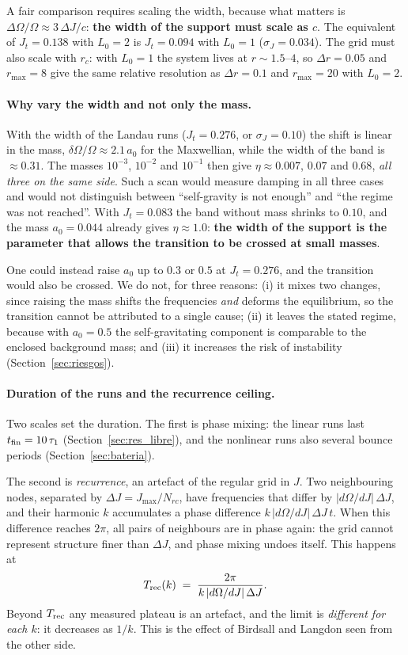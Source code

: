 \documentclass[11pt,a4paper]{article}
\begin{document}
A fair comparison requires scaling the width, because what matters is
$\Delta\Omega/\Omega\approx 3\,\Delta J/c$: \textbf{the width of the support must scale as $c$}. The
equivalent of $J_t=0.138$ with $L_0=2$ is $J_t=0.094$ with $L_0=1$ ($\sigma_J=0.034$). The grid must
also scale with $r_c$: with $L_0=1$ the system lives at $r\sim1.5$--$4$, so $\Delta r=0.05$ and
$r_{\max}=8$ give the same relative resolution as $\Delta r=0.1$ and $r_{\max}=20$ with $L_0=2$.

\paragraph{Why vary the width and not only the mass.}
\label{sec:ancho}
With the width of the Landau runs ($J_t=0.276$, or $\sigma_J=0.10$) the shift is linear in the
mass, $\delta\Omega/\Omega\approx 2.1\,a_0$ for the Maxwellian, while the width of the band is $\approx 0.31$.
The masses $10^{-3}$, $10^{-2}$ and $10^{-1}$ then give $\eta\approx0.007$, $0.07$ and $0.68$, \emph{all
three on the same side}. Such a scan would measure damping in all three cases and would
not distinguish between ``self-gravity is not enough'' and ``the regime was not
reached''. With $J_t=0.083$ the band without mass shrinks to $0.10$, and the mass $a_0=0.044$
already gives $\eta\approx 1.0$: \textbf{the width of the support is the parameter that allows
the transition to be crossed at small masses}.

One could instead raise $a_0$ up to $0.3$ or $0.5$ at $J_t=0.276$, and the transition would also
be crossed. We do not, for three reasons: (i) it mixes two changes, since raising the mass
shifts the frequencies \emph{and} deforms the equilibrium, so the transition cannot be
attributed to a single cause; (ii) it leaves the stated regime, because with $a_0=0.5$ the
self-gravitating component is comparable to the enclosed background mass; and (iii) it
increases the risk of instability (Section~\ref{sec:riesgos}).

\paragraph{Duration of the runs and the recurrence ceiling.}
\label{sec:recurrencia}
Two scales set the duration. The first is phase mixing: the linear runs last
$t_{\rm fin}=10\,\tau_1$ (Section~\ref{sec:res_libre}), and the nonlinear runs also several
bounce periods (Section~\ref{sec:bateria}).

The second is \emph{recurrence}, an artefact of the regular grid in $J$. Two neighbouring
nodes, separated by $\Delta J=J_{\max}/N_{rc}$, have frequencies that differ by
$|d\Omega/dJ|\,\Delta J$, and their harmonic $k$ accumulates a phase difference
$k\,|d\Omega/dJ|\,\Delta J\,t$. When this difference reaches $2\pi$, all pairs of neighbours are in
phase again: the grid cannot represent structure finer than $\Delta J$, and phase mixing
undoes itself. This happens at
\[
  T_{\rm rec}(k) \;=\; \frac{2\pi}{k\,|d\Omega/dJ|\,\Delta J} .
\]
Beyond $T_{\rm rec}$ any measured plateau is an artefact, and the limit is \emph{different for
each $k$}: it decreases as $1/k$. This is the effect of Birdsall and Langdon seen from the
other side.
\end{document}
